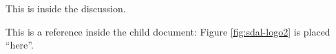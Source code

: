 \documentclass[../master.tex]{subfiles}
\begin{document}
This is inside the discussion.

This is a reference inside the child document:
Figure \ref{fig:sdal-logo2} is placed ``here''.
\end{document}

